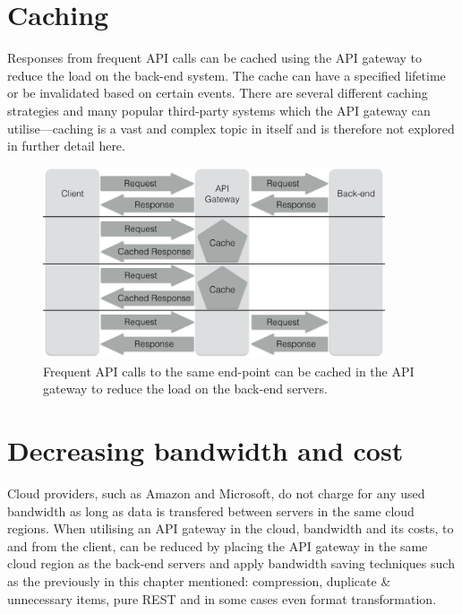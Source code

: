 \documentclass{cslthse-msc}
\begin{document}
\section{Caching}
\label{caching}
Responses from frequent API calls can be cached using the API gateway to reduce the load on the back-end system\cite[page 107]{AASG}. The cache can have a specified lifetime or be invalidated based on certain events. There are several different caching strategies and many popular third-party systems which the API gateway can utilise---caching is a vast and complex topic in itself and is therefore not explored in further detail here.

\begin{figure}[H]
  \centering
    \begin{center}
      \includegraphics[width=0.9\textwidth]{images/api_gateway_cache.png}
    \end{center}
  \caption{Frequent API calls to the same end-point can be cached in the API gateway to reduce the load on the back-end servers.}
\end{figure}

\section{Decreasing bandwidth and cost}
Cloud providers, such as Amazon\cite{cloud_amazon} and Microsoft\cite{cloud_microsoft}, do not charge for any used bandwidth as long as data is transfered between servers in the same cloud regions. When utilising an API gateway in the cloud, bandwidth and its costs, to and from the client, can be reduced by placing the API gateway in the same cloud region as the back-end servers and apply bandwidth saving techniques such as the previously in this chapter mentioned: compression, duplicate \& unnecessary items, pure REST and in some cases even format transformation.
\end{document}
